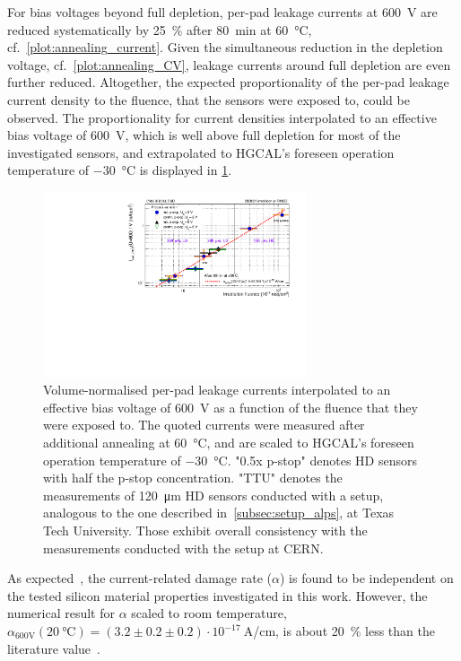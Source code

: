 For bias voltages beyond full depletion, per-pad leakage currents at \SI{600}{\volt} are reduced systematically by \SI{25}{\percent} after \SI{80}{\minute} at \SI{60}{\celsius}, cf.~\ref{plot:annealing_current}.
Given the simultaneous reduction in the depletion voltage, cf.~\ref{plot:annealing_CV}, leakage currents around full depletion are even further reduced.
Altogether, the expected proportionality of the per-pad leakage current density to the fluence, that the sensors were exposed to, could be observed.
The proportionality for current densities interpolated to an effective bias voltage of \SI{600}{\volt}, which is well above full depletion for most of the investigated sensors, and extrapolated to HGCAL's foreseen operation temperature of \SI{-30}{\celsius} is displayed in \ref{plot:alpha_600}.
\begin{figure}
	\captionsetup[subfigure]{aboveskip=-1pt,belowskip=-1pt}
	\centering
    \includegraphics[width=0.69\textwidth]{plots/alpha/alpha_600V.pdf}
	\caption{
		Volume-normalised per-pad leakage currents interpolated to an effective bias voltage of \SI{600}{\volt} as a function of the fluence that they were exposed to.
        The quoted currents were measured after additional annealing at \SI{60}{\celsius}, and are scaled to HGCAL's foreseen operation temperature of \SI{-30}{\celsius}.
		"0.5x p-stop" denotes HD sensors with half the p-stop concentration.
		"TTU" denotes the measurements of \SI{120}{\micro\meter} HD sensors conducted with a setup, analogous to the one described in~\ref{subsec:setup_alps}, at Texas Tech University. 
		Those exhibit overall consistency with the measurements conducted with the setup at CERN.
		}
	\label{plot:alpha_600}
\end{figure}
As expected~\cite{MOLL199987}, the current-related damage rate ($\alpha$) is found to be independent on the tested silicon material properties investigated in this work.
However, the numerical result for $\alpha$ scaled to room temperature, $\alpha_\text{600V}(\SI{+20}{\celsius})=\left(3.2\pm 0.2\pm 0.2\right)\cdot 10^{-17}~$A/cm, is about \SI{20}{\percent} less than the literature value~\cite{moll:SiDamages}.
